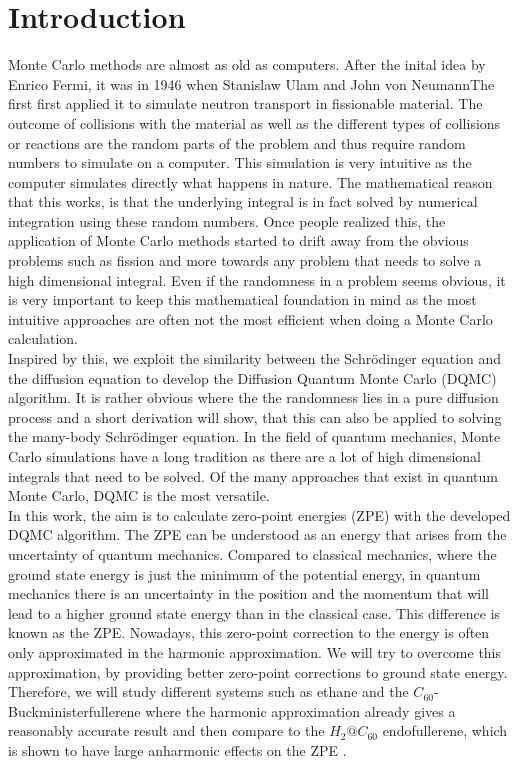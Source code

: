 \documentclass [12pt]{report}
\begin{document}
\chapter{Introduction}
Monte Carlo methods are almost as old as computers. After the inital idea by Enrico Fermi, it was in 1946 when Stanislaw Ulam and John von NeumannThe first first applied it to simulate neutron transport in fissionable material. The outcome of collisions with the material as well as the different types of collisions or reactions are the random parts of the problem and thus require random numbers to simulate on a computer. This simulation is very intuitive as the computer simulates directly what happens in nature. The mathematical reason that this works, is that the underlying integral is in fact solved by numerical integration using these random numbers. Once people realized this, the application of Monte Carlo methods started to drift away from the obvious problems such as fission and more towards any problem that needs to solve a high dimensional integral. Even if the randomness in a problem seems obvious, it is very important to keep this mathematical foundation in mind as the most intuitive approaches are often not the most efficient when doing a Monte Carlo calculation.\\
Inspired by this, we exploit the similarity between the Schrödinger equation and the diffusion equation to develop the Diffusion Quantum Monte Carlo (DQMC) algorithm. It is rather obvious where the the randomness lies in a pure diffusion process and a short derivation will show, that this can also be applied to solving the many-body Schrödinger equation. In the field of quantum mechanics, Monte Carlo simulations have a long tradition as there are a lot of high dimensional integrals that need to be solved. Of the many approaches that exist in quantum Monte Carlo, DQMC is the most versatile.\\
In this work, the aim is to calculate zero-point energies (ZPE) with the developed DQMC algorithm. The ZPE can be understood as an energy that arises from the uncertainty of quantum mechanics. Compared to classical mechanics, where the ground state energy is just the minimum of the potential energy, in quantum mechanics there is an uncertainty in the position and the momentum that will lead to a higher ground state energy than in the classical case. This difference is known as the ZPE. Nowadays, this zero-point correction to the energy is often only approximated in the harmonic approximation. We will try to overcome this approximation, by providing better zero-point corrections to ground state energy.
Therefore, we will study different systems such as ethane  and the $C_{60}$-Buckministerfullerene where the harmonic approximation already gives a reasonably accurate result and then compare to the $H_2@C_{60}$ endofullerene, which is shown to have large anharmonic effects on the ZPE \cite{h2@c60}.
\end{document}
